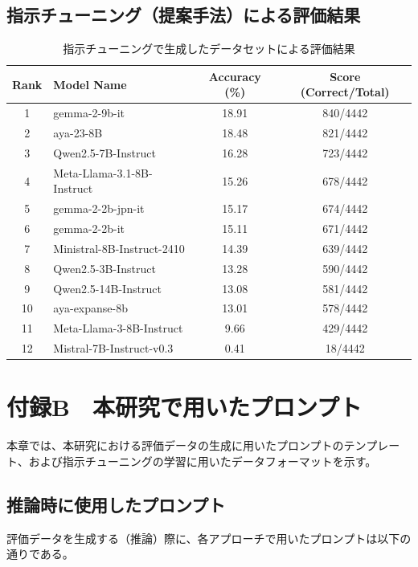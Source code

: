 \documentclass[a4paper,11pt]{jreport}
\begin{document}
\section{指示チューニング（提案手法）による評価結果}
\begin{table}[hbtp]
  \centering
  \caption{指示チューニングで生成したデータセットによる評価結果}
  \label{tab:appendix_instruction_tuned}
  \begin{tabular}{clcc}
    \hline
    Rank & Model Name & Accuracy (\%) & Score (Correct/Total) \\
    \hline
    1 & gemma-2-9b-it & 18.91 & 840/4442 \\
    2 & aya-23-8B & 18.48 & 821/4442 \\
    3 & Qwen2.5-7B-Instruct & 16.28 & 723/4442 \\
    4 & Meta-Llama-3.1-8B-Instruct & 15.26 & 678/4442 \\
    5 & gemma-2-2b-jpn-it & 15.17 & 674/4442 \\
    6 & gemma-2-2b-it & 15.11 & 671/4442 \\
    7 & Ministral-8B-Instruct-2410 & 14.39 & 639/4442 \\
    8 & Qwen2.5-3B-Instruct & 13.28 & 590/4442 \\
    9 & Qwen2.5-14B-Instruct & 13.08 & 581/4442 \\
    10 & aya-expanse-8b & 13.01 & 578/4442 \\
    11 & Meta-Llama-3-8B-Instruct & 9.66 & 429/4442 \\
    12 & Mistral-7B-Instruct-v0.3 & 0.41 & 18/4442 \\
    \hline
  \end{tabular}
\end{table}








\chapter*{付録B　本研究で用いたプロンプト}
\label{chap:appendix_b}

本章では、本研究における評価データの生成に用いたプロンプトのテンプレート、および指示チューニングの学習に用いたデータフォーマットを示す。

\section{推論時に使用したプロンプト}
評価データを生成する（推論）際に、各アプローチで用いたプロンプトは以下の通りである。
\end{document}
